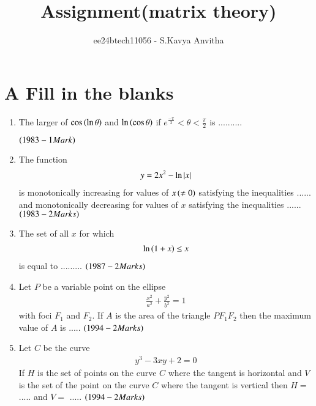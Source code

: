 \documentclass[journal,12pt,twocolumn]{IEEEtran}
\theoremstyle{remark}
\begin{document}

\vspace{3cm}

\title{Assignment(matrix theory)}
\author{ee24btech11056 - S.Kavya Anvitha}
\maketitle
\section{A Fill in the blanks}

\begin{enumerate}
\item The larger of $\cos \left(\ln \theta\right)$ and 
$\ln \left(\cos \theta\right)$ if 
$e^{\frac{-\pi}{2}}< \theta< \frac{\pi}{2}$
is ..........

\hfill$\left(1983 - 1 Mark\right)$\\


\item The function \begin{align*}y=2x^{2}-\ln \left\vert x\right\vert\end{align*}
is monotonically increasing for values of $x\left(\neq0\right)$ satisfying
the inequalities ...... and monotonically decreasing for values of $x$
satisfying the inequalities  ......
\hfill$\left(1983 - 2 Marks\right)$\\
	
\item The set of all $x$ for which 
	\begin{align*}
	\ln \left(1+x\right) \leq x
	\end{align*}
is equal to .........
\hfill$\left(1987 - 2 Marks\right)$\\

\item Let $P$ be a variable point on the ellipse
\begin{align*}
\frac{x^2}{a^2}+\frac{y^2}{b^2} = 1
\end{align*}
with foci $F_1$ and $F_2$. If $A$ is the area of the triangle $PF_1F_2$ 
then the maximum value of $A$ is .....
\hfill$\left(1994 - 2 Marks\right)$\\

\item Let $C$ be the curve 
	\begin{align*}
	y^3 - 3xy + 2 = 0
	\end{align*} 
If $H$ is the set of points on the curve $C$ where the tangent is horizontal and $V$ is
the set of the point on the curve $C$ where the tangent is vertical
then $H =$ ..... and $V =$ .....
\hfill$\left(1994 - 2 Marks\right)$\\
\end{enumerate}
\end{document}
